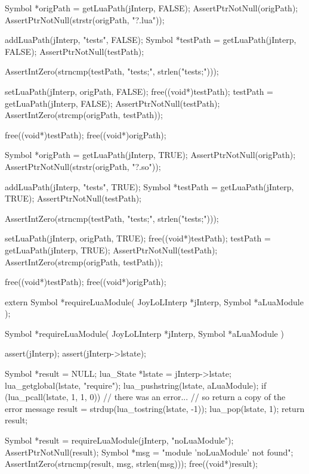\startCTest
  Symbol *origPath = getLuaPath(jInterp, FALSE);
  AssertPtrNotNull(origPath);
  AssertPtrNotNull(strstr(origPath, "?.lua"));

  addLuaPath(jInterp, "tests", FALSE);
  Symbol *testPath = getLuaPath(jInterp, FALSE);
  AssertPtrNotNull(testPath);

  AssertIntZero(strncmp(testPath, "tests;", strlen("tests;")));
  
  setLuaPath(jInterp, origPath, FALSE);
  free((void*)testPath);
  testPath = getLuaPath(jInterp, FALSE);
  AssertPtrNotNull(testPath);
  AssertIntZero(strcmp(origPath, testPath));

  free((void*)testPath);
  free((void*)origPath);
\stopCTest
\stopTestCase


\startCTest
  Symbol *origPath = getLuaPath(jInterp, TRUE);
  AssertPtrNotNull(origPath);
  AssertPtrNotNull(strstr(origPath, "?.so"));

  addLuaPath(jInterp, "tests", TRUE);
  Symbol *testPath = getLuaPath(jInterp, TRUE);
  AssertPtrNotNull(testPath);

  AssertIntZero(strncmp(testPath, "tests;", strlen("tests;")));
  
  setLuaPath(jInterp, origPath, TRUE);
  free((void*)testPath);
  testPath = getLuaPath(jInterp, TRUE);
  AssertPtrNotNull(testPath);
  AssertIntZero(strcmp(origPath, testPath));
  
  free((void*)testPath);
  free((void*)origPath);
\stopCTest
\stopTestCase
\stopTestSuite


\startCHeader
extern Symbol *requireLuaModule(
  JoyLoLInterp *jInterp,
  Symbol *aLuaModule
);
\stopCHeader

\startCCode
Symbol *requireLuaModule(
  JoyLoLInterp *jInterp,
  Symbol *aLuaModule
) {
  assert(jInterp);
  assert(jInterp->lstate);

  Symbol *result = NULL;
  lua_State *lstate = jInterp->lstate;
  lua_getglobal(lstate, "require");
  lua_pushstring(lstate, aLuaModule);
  if (lua_pcall(lstate, 1, 1, 0)) {
    // there was an error...
    // so return a copy of the error message
    result = strdup(lua_tostring(lstate, -1));
  }
  lua_pop(lstate, 1);
  return result;
}
\stopCCode


\startCTest
  Symbol *result = requireLuaModule(jInterp, "noLuaModule");
  AssertPtrNotNull(result);
  Symbol *msg = "module 'noLuaModule' not found";
  AssertIntZero(strncmp(result, msg, strlen(msg)));
  free((void*)result);
\stopCTest


